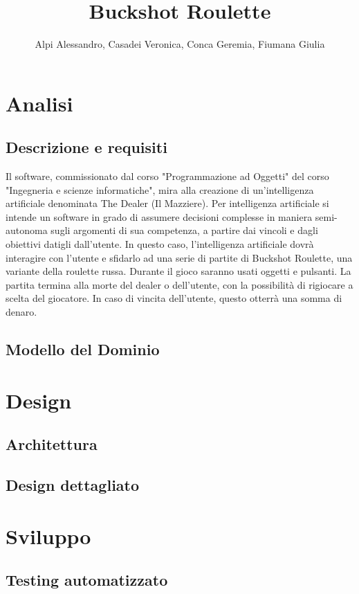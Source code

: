 \documentclass{article}
\title{Buckshot Roulette}
\author{Alpi Alessandro, Casadei Veronica, Conca Geremia, Fiumana Giulia}
\begin{document}
\maketitle

\tableofcontents

\section{Analisi}
\subsection{Descrizione e requisiti}
Il software, commissionato dal corso "Programmazione ad Oggetti" del corso "Ingegneria e scienze informatiche", mira alla creazione di un'intelligenza artificiale denominata The Dealer (Il Mazziere). Per intelligenza artificiale si intende un software in grado di assumere decisioni complesse in maniera semi-autonoma sugli argomenti di sua competenza, a partire dai vincoli e dagli obiettivi datigli dall'utente. In questo caso, l'intelligenza artificiale dovrà interagire con l'utente e sfidarlo ad una serie di partite di Buckshot Roulette, una variante della roulette russa. Durante il gioco saranno usati oggetti e pulsanti. La partita termina alla morte del dealer o dell'utente, con la possibilità di rigiocare a scelta del giocatore. In caso di vincita dell'utente, questo otterrà una somma di denaro.


\subsection{Modello del Dominio}


\section{Design}
\subsection{Architettura}
\subsection{Design dettagliato}

\section{Sviluppo}
\subsection{Testing automatizzato}
\end{document}
